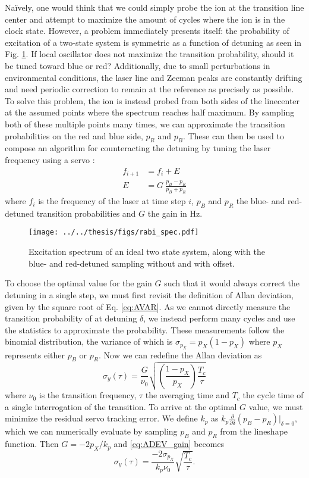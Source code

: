 \documentclass[a4paper,12pt]{article}
\newcommand{\pd}[2]{\frac{\partial #1}{\partial #2}}
\begin{document}
Naïvely, one would think that we could simply probe the ion at the transition line
center and attempt to maximize the amount of cycles where the ion is in the clock state.
However, a problem immediately presents itself: the probability of excitation
of a two-state system is symmetric as a function of detuning as seen in Fig. \ref{fig:exc_spec}.
If local oscillator does not maximize the transition probability, should it be 
tuned toward blue or red?
Additionally, due to small perturbations in environmental conditions, the laser
line and Zeeman peaks are constantly drifting and need periodic correction to remain at the reference
as precisely as possible.
To solve this problem, the ion is instead probed from both sides of the linecenter
at the assumed points where the spectrum reaches half maximum.
By sampling both of these multiple points many times, we can approximate the 
transition probabilities on the red and blue side, $p_R$ and $p_B$.
These can then be used to compose an algorithm for counteracting the detuning
by tuning the laser frequency using a servo \cite{Dube2015a}:
\begin{align}
  f_{i+1} &= f_{i} + E \\
  E &= G\: \frac{p_B - p_R}{p_B + p_R}
\end{align}
where $f_i$ is the frequency of the laser at time step $i$, $p_B$ and $p_R$ the 
blue- and red-detuned transition probabilities and $G$ the gain in Hz.

\begin{figure}
  \texttt{[image: ../../thesis/figs/rabi\_spec.pdf]}
  \centering
  \caption{Excitation spectrum of an ideal two state system, along with
  the blue- and red-detuned sampling without and with offset.}
  \label{fig:exc_spec}
\end{figure}

To choose the optimal value for the gain $G$ such that it would always correct
the detuning in a single step, we must first revisit the definition of Allan
deviation, given by the square root of Eq. \ref{eq:AVAR}.
As we cannot directly measure the transition probability of at detuning $\delta$,
we instead perform many cycles and use the statistics to approximate the probability.
These measurements follow the binomial distribution, the variance of which is
$\sigma_{p_X} = p_X(1-p_X)$ where $p_X$ represents either $p_B$ or $p_R$.
Now we can redefine the Allan deviation as
\begin{equation}
  \sigma_y(\tau) = \frac{G}{\nu_0} \sqrt{\left(\frac{1-p_X}{p_X}\right) \frac{T_c}{\tau}}
  \label{eq:ADEV_gain}
\end{equation}
where $\nu_0$ is the transition frequency, $\tau$ the averaging time and $T_c$ the
cycle time of a single interrogation of the transition.
To arrive at the optimal $G$ value, we must minimize the residual servo tracking error.
We define $k_p$ as $k_p \pd{}{\delta} (p_B - p_R) |_{\delta=0}$, which we can numerically
evaluate by sampling $p_B$ and $p_R$ from the lineshape function.
Then $G= -2p_X/k_p$ and \eqref{eq:ADEV_gain} becomes
\begin{equation}
  \sigma_y(\tau) = \frac{-2 \sigma_{p_X}}{k_p \nu_0} \sqrt{\frac{T_c}{\tau}} \textrm{.}
\end{equation}
\end{document}
